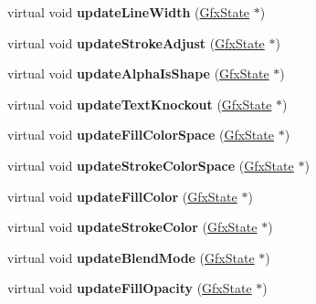 \begin{DoxyCompactItemize}
virtual void {\bfseries update\+Line\+Width} (\hyperlink{class_gfx_state}{Gfx\+State} $\ast$)
\item 
\mbox{\label{class_output_dev_a306598c4f6ef12322e1f575c09e1fe10}} 
virtual void {\bfseries update\+Stroke\+Adjust} (\hyperlink{class_gfx_state}{Gfx\+State} $\ast$)
\item 
\mbox{\label{class_output_dev_a653436589426a8652bacecd4cddff417}} 
virtual void {\bfseries update\+Alpha\+Is\+Shape} (\hyperlink{class_gfx_state}{Gfx\+State} $\ast$)
\item 
\mbox{\label{class_output_dev_a5e1ad53b378a61a9035d2d1a232aa9ff}} 
virtual void {\bfseries update\+Text\+Knockout} (\hyperlink{class_gfx_state}{Gfx\+State} $\ast$)
\item 
\mbox{\label{class_output_dev_af46b04e9b1d4caedc883e2bd944d5731}} 
virtual void {\bfseries update\+Fill\+Color\+Space} (\hyperlink{class_gfx_state}{Gfx\+State} $\ast$)
\item 
\mbox{\label{class_output_dev_a213a611aadc3324d7a0ec0da6522c4ef}} 
virtual void {\bfseries update\+Stroke\+Color\+Space} (\hyperlink{class_gfx_state}{Gfx\+State} $\ast$)
\item 
\mbox{\label{class_output_dev_a15416568303178d9ed4845b3c09dff6a}} 
virtual void {\bfseries update\+Fill\+Color} (\hyperlink{class_gfx_state}{Gfx\+State} $\ast$)
\item 
\mbox{\label{class_output_dev_a0899a8d22039e61343357444dcc48578}} 
virtual void {\bfseries update\+Stroke\+Color} (\hyperlink{class_gfx_state}{Gfx\+State} $\ast$)
\item 
\mbox{\label{class_output_dev_abe4aa366ffedf9e4c9c9e99fb37413d2}} 
virtual void {\bfseries update\+Blend\+Mode} (\hyperlink{class_gfx_state}{Gfx\+State} $\ast$)
\item 
\mbox{\label{class_output_dev_a3c08aea8dd5180bef704b1c484ae60ae}} 
virtual void {\bfseries update\+Fill\+Opacity} (\hyperlink{class_gfx_state}{Gfx\+State} $\ast$)
\item 

\end{DoxyCompactItemize}
